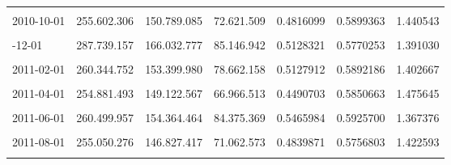 \documentclass[12pt]{article}
\begin{document}
\begin{longtable}[t]{llllrrr}
\cellcolor{gray!10}{2010-09-01} & \cellcolor{gray!10}{254.630.048} & \cellcolor{gray!10}{150.821.245} & \cellcolor{gray!10}{72.192.925} & \cellcolor{gray!10}{0.4786655} & \cellcolor{gray!10}{0.5923152} & \cellcolor{gray!10}{1.446747}\\
2010-10-01 & 255.602.306 & 150.789.085 & 72.621.509 & 0.4816099 & 0.5899363 & 1.440543\\
\cellcolor{gray!10}{2010-11-01} & \cellcolor{gray!10}{265.053.833} & \cellcolor{gray!10}{157.534.763} & \cellcolor{gray!10}{70.966.448} & \cellcolor{gray!10}{0.4504812} & \cellcolor{gray!10}{0.5943501} & \cellcolor{gray!10}{1.485016}\\
\addlinespace
2010-12-01 & 287.739.157 & 166.032.777 & 85.146.942 & 0.5128321 & 0.5770253 & 1.391030\\
\cellcolor{gray!10}{2011-01-01} & \cellcolor{gray!10}{263.311.792} & \cellcolor{gray!10}{154.131.680} & \cellcolor{gray!10}{84.367.115} & \cellcolor{gray!10}{0.5473704} & \cellcolor{gray!10}{0.5853581} & \cellcolor{gray!10}{1.360452}\\
2011-02-01 & 260.344.752 & 153.399.980 & 78.662.158 & 0.5127912 & 0.5892186 & 1.402667\\
\cellcolor{gray!10}{2011-03-01} & \cellcolor{gray!10}{258.418.003} & \cellcolor{gray!10}{152.946.557} & \cellcolor{gray!10}{74.447.336} & \cellcolor{gray!10}{0.4867539} & \cellcolor{gray!10}{0.5918572} & \cellcolor{gray!10}{1.436304}\\
2011-04-01 & 254.881.493 & 149.122.567 & 66.966.513 & 0.4490703 & 0.5850663 & 1.475645\\
\addlinespace
\cellcolor{gray!10}{2011-05-01} & \cellcolor{gray!10}{256.145.571} & \cellcolor{gray!10}{151.393.660} & \cellcolor{gray!10}{73.545.747} & \cellcolor{gray!10}{0.4857915} & \cellcolor{gray!10}{0.5910454} & \cellcolor{gray!10}{1.436618}\\
2011-06-01 & 260.499.957 & 154.364.464 & 84.375.369 & 0.5465984 & 0.5925700 & 1.367376\\
\cellcolor{gray!10}{2011-07-01} & \cellcolor{gray!10}{259.274.878} & \cellcolor{gray!10}{150.832.033} & \cellcolor{gray!10}{73.656.353} & \cellcolor{gray!10}{0.4883336} & \cellcolor{gray!10}{0.5817457} & \cellcolor{gray!10}{1.423811}\\
2011-08-01 & 255.050.276 & 146.827.417 & 71.062.573 & 0.4839871 & 0.5756803 & 1.422593\\
\cellcolor{gray!10}{2011-09-01} & \cellcolor{gray!10}{262.523.711} & \cellcolor{gray!10}{150.158.812} & \cellcolor{gray!10}{76.139.849} & \cellcolor{gray!10}{0.5070621} & \cellcolor{gray!10}{0.5719819} & \cellcolor{gray!10}{1.392664}\\

\end{longtable}
\end{document}
